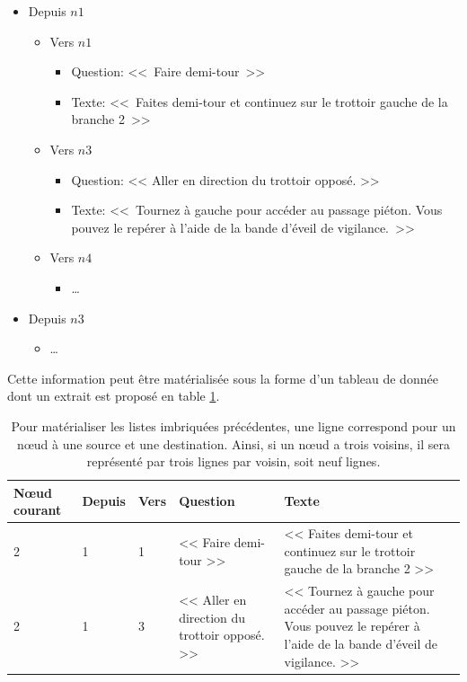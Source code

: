 \begin{itemize}
    \item Depuis $n1$
        \begin{itemize}
            \item Vers $n1$
                \begin{itemize}
                    \item Question: <<~Faire demi-tour~>>
                    \item Texte: <<~Faites demi-tour et continuez sur le trottoir gauche de la branche 2~>>
                \end{itemize}
            \item Vers $n3$
                \begin{itemize}
                    \item Question: << Aller en direction du trottoir opposé. >>
                    \item Texte: <<~Tournez à gauche pour accéder au passage piéton. Vous pouvez le repérer à l'aide de la bande d'éveil de vigilance.~>>
                \end{itemize}
            \item Vers $n4$
                \begin{itemize}
                    \item \dots
                \end{itemize}
        \end{itemize}
    \item Depuis $n3$
        \begin{itemize}
            \item \dots
        \end{itemize}
\end{itemize}

Cette information peut être matérialisée sous la forme d'un tableau de donnée dont un extrait est proposé en table \ref{tab:experimentation_desc_egocentree}.

\begin{table}[ht]
    \begin{center}
        \footnotesize
        \begin{tabular}{ | l | l | l | p{3.1cm} | p{6.2cm} | }
            \textbf{Nœud courant} & \textbf{Depuis} & \textbf{Vers} & \textbf{Question} & \textbf{Texte}\\
            \hline
            2 & 1 & 1 & << Faire demi-tour >> & << Faites demi-tour et continuez sur le trottoir gauche de la branche 2 >> \\
            2 & 1 & 3 & << Aller en direction du trottoir opposé. >> & << Tournez à gauche pour accéder au passage piéton. Vous pouvez le repérer à l'aide de la bande d'éveil de vigilance. >>
        \end{tabular}
    \end{center}
    \caption[Schéma tabulaire pour la génération d'une description égocentrée]{Pour matérialiser les listes imbriquées précédentes, une ligne correspond pour un nœud à une source et une destination. Ainsi, si un nœud a trois voisins, il sera représenté par trois lignes par voisin, soit neuf lignes.}
    \label{tab:experimentation_desc_egocentree}
\end{table}

